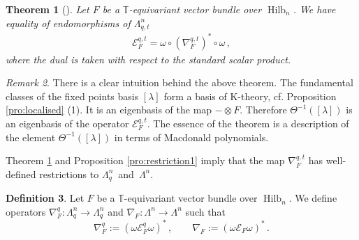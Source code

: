 \documentclass[12pt,a4paper]{amsart}
\theoremstyle{plain}
\newtheorem{tw}{Theorem}[section]
\theoremstyle{definition}
\newtheorem{df}[tw]{Definition}
\theoremstyle{remark}
\newtheorem{rem}[tw]{Remark}
\newcommand{\Hilb}[1]{\operatorname{Hilb}_{{#1}}}
\newcommand{\TT}{\mathbb{T}}
\newcommand{\E}{\mathcal{E}}
\DeclareMathOperator{\Hom}{Hom}
\begin{document}
\begin{tw}[{\cite[Theorem 4.1 and its proof]{Boissiere}}] \label{tw:B1}
	Let $F$ be a $\TT$-equivariant vector bundle over $\Hilb{n}$. We have equality of endomorphisms of $\Lambda_{q,t}^n$
	\begin{align*}
		\E^{q,t}_F=\omega\circ(\nabla^{q,t}_F)^*\circ \omega \,,
	\end{align*}
	where the dual is taken with respect to the standard scalar product.
\end{tw}
\begin{rem}
	There is a clear intuition behind the above theorem. The fundamental classes of the fixed points basis $[\lambda]$ form a basis of K-theory, cf. Proposition \ref{pro:localised} (1). It is an eigenbasis of the map $-\otimes F$. Therefore
	$\Theta^{-1}([\lambda])$ is an eigenbasis of the operator $\E_F^{q,t}$.
	The essence of the theorem is a description of the element $\Theta^{-1}([\lambda])$ in terms of Macdonald polynomials.
\end{rem}
\noindent Theorem \ref{tw:B1} and Proposition \ref{pro:restriction1} imply that the map $\nabla_F^{q,t}$ has well-defined restrictions to \hbox{$\Lambda^n_q$ and $\Lambda^n$.}

\begin{df} \label{df:restriction}
	Let $F$ be a $\TT$-equivariant vector bundle over $\Hilb{n}$. We define operators $\nabla_F^{q}:\Lambda^n_q\to \Lambda_q^n$ and $\nabla_F:\Lambda^n\to \Lambda^n$ such that
	$$
	\nabla^{q}_F:=(\omega\E^{q}_F\omega)^*\,, \qquad \nabla_F:=(\omega\E_F\omega)^*\,.
	$$
\end{df}
\end{document}
